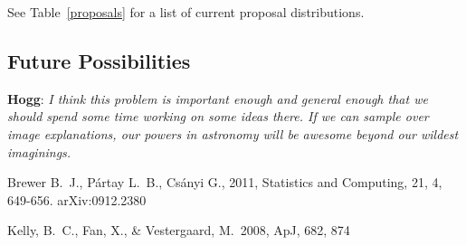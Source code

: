 \documentclass[letterpaper, 11pt]{article}
\begin{document}
See Table~\ref{proposals} for a list of current proposal distributions.

\subsection{Future Possibilities}
{\bf Hogg}: {\it I think this problem is important enough and general enough
that we should spend some time working on some ideas there.  If we can sample
over image explanations, our powers in astronomy will be awesome
beyond our wildest imaginings.}


\begin{thebibliography}{99}
 Brewer B.~J., P{\'a}rtay L.~B.,
Cs{\'a}nyi G., 2011, Statistics and Computing, 21, 4, 649-656. arXiv:0912.2380

 Kelly, B.~C., Fan, X., 
\& Vestergaard, M.\ 2008, ApJ, 682, 874 
\end{thebibliography}
\end{document}
